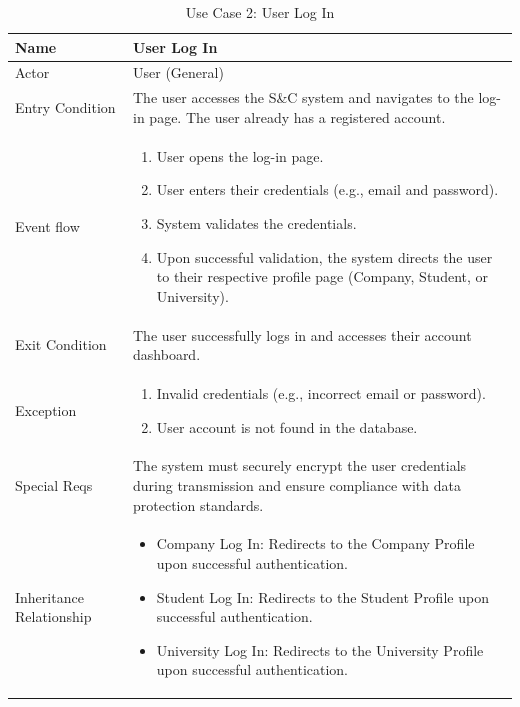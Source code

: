 \begin{table}[H]
\centering
\begin{tabular}{|l|p{12cm}|}
\hline
Name             & User Log In \\ \hline
Actor            & User (General) \\ \hline
Entry Condition  & 
The user accesses the S\&C system and navigates to the log-in page. The user already has a registered account. \\ \hline
Event flow       & 
\begin{enumerate}
    \item User opens the log-in page.
    \item User enters their credentials (e.g., email and password).
    \item System validates the credentials.
    \item Upon successful validation, the system directs the user to their respective profile page (Company, Student, or University).
\end{enumerate} \\ \hline
Exit Condition   & The user successfully logs in and accesses their account dashboard. \\ \hline
Exception        & 
\begin{enumerate}
    \item Invalid credentials (e.g., incorrect email or password).
    \item User account is not found in the database.
\end{enumerate} \\ \hline
Special Reqs     & The system must securely encrypt the user credentials during transmission and ensure compliance with data protection standards. \\ \hline
Inheritance Relationship & 
\begin{itemize}
    \item Company Log In: Redirects to the Company Profile upon successful authentication.
    \item Student Log In: Redirects to the Student Profile upon successful authentication.
    \item University Log In: Redirects to the University Profile upon successful authentication. 
\end{itemize} \\ \hline
\end{tabular}
\caption{Use Case 2: User Log In}
\label{tab:user_login}
\end{table}

